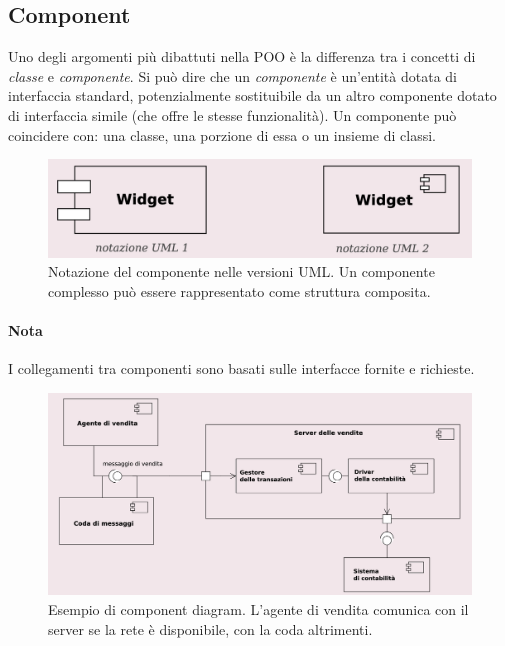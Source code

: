\subsection{Component}

Uno degli argomenti più dibattuti nella POO è la differenza tra i concetti di \textit{classe} e \textit{componente}. Si può dire che un \textit{componente} è un'entità dotata di interfaccia standard, potenzialmente sostituibile da un altro componente dotato di interfaccia simile (che offre le stesse funzionalità). Un componente può coincidere con: una classe, una porzione di essa o un insieme di classi.

\begin{figure}[H]
    \centering
    \includegraphics[width=0.75\linewidth]{assets/UML/component/component-1.png}
    \caption{Notazione del componente nelle versioni UML. Un componente complesso può essere rappresentato come struttura composita.}
\end{figure}

\paragraph{Nota} I collegamenti tra componenti sono basati sulle interfacce fornite e richieste.

\begin{figure}[H]
    \centering
    \includegraphics[width=0.75\linewidth]{assets/UML/component/component-2.png}
    \caption{Esempio di component diagram. L'agente di vendita comunica con il server se la rete è disponibile, con la coda altrimenti.}
\end{figure}

\newpage